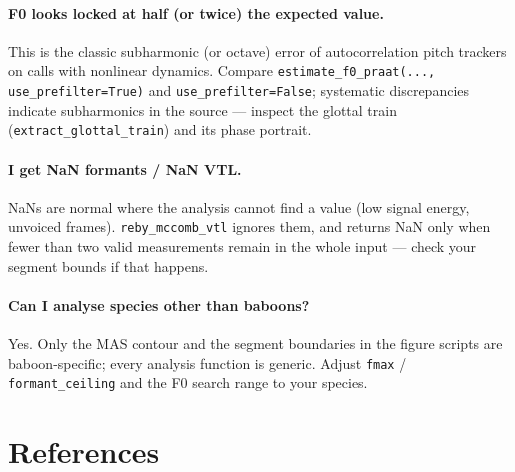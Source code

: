 \documentclass[11pt,a4paper]{article}
\begin{document}
\paragraph{F0 looks locked at half (or twice) the expected value.}
This is the classic subharmonic (or octave) error of autocorrelation
pitch trackers on calls with nonlinear dynamics. Compare
\texttt{estimate\_f0\_praat(..., use\_prefilter=True)} and
\texttt{use\_prefilter=False}; systematic discrepancies indicate
subharmonics in the source --- inspect the glottal train
(\texttt{extract\_glottal\_train}) and its phase portrait.

\paragraph{I get NaN formants / NaN VTL.}
NaNs are normal where the analysis cannot find a value (low signal
energy, unvoiced frames). \texttt{reby\_mccomb\_vtl} ignores them, and
returns NaN only when fewer than two valid measurements remain in the
whole input --- check your segment bounds if that happens.

\paragraph{Can I analyse species other than baboons?}
Yes. Only the MAS contour and the segment boundaries in the figure
scripts are baboon-specific; every analysis function is generic. Adjust
\texttt{fmax} / \texttt{formant\_ceiling} and the F0 search range to
your species.

\section{References}
\end{document}
